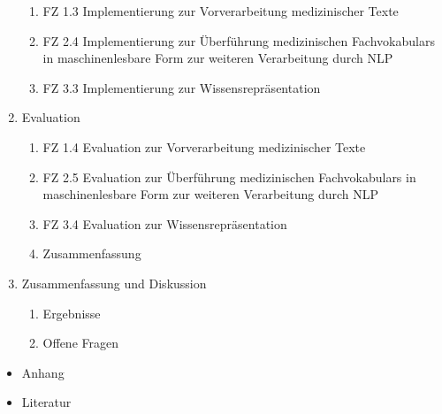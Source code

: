 \begin{enumerate}
\begin{enumerate}[label=\theenumi.\arabic*]
\item FZ 1.3 Implementierung zur Vorverarbeitung medizinischer Texte
\item FZ 2.4 Implementierung zur Überführung medizinischen Fachvokabulars
in maschinenlesbare Form zur weiteren Verarbeitung durch NLP
\item FZ 3.3 Implementierung zur Wissensrepräsentation
\end{enumerate}

\item Evaluation

\begin{enumerate}[label=\theenumi.\arabic*]
\item FZ 1.4 Evaluation zur Vorverarbeitung medizinischer Texte
\item FZ 2.5 Evaluation zur Überführung medizinischen Fachvokabulars
in maschinenlesbare Form zur weiteren Verarbeitung durch NLP
\item FZ 3.4 Evaluation zur Wissensrepräsentation
\item Zusammenfassung
\end{enumerate}

\item Zusammenfassung und Diskussion

\begin{enumerate}[label=\theenumi.\arabic*]
\item Ergebnisse
\item Offene Fragen

\end{enumerate}
\end{enumerate}

\begin{itemize}
\item Anhang
\item Literatur
\end{itemize}
